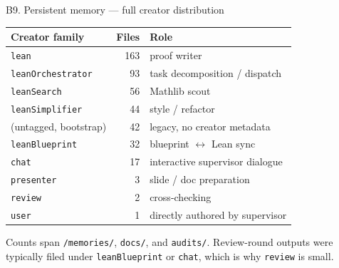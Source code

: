 \documentclass[aspectratio=169,10pt]{beamer}
\begin{document}
\begin{frame}{B9. Persistent memory --- full creator distribution}
    \begin{center}
    {\footnotesize
    \begin{tabular}{@{}l r l@{}}
        \toprule
        Creator family & Files & Role \\
        \midrule
        \texttt{lean}             & 163 & proof writer \\
        \texttt{leanOrchestrator} & 93  & task decomposition / dispatch \\
        \texttt{leanSearch}       & 56  & Mathlib scout \\
        \texttt{leanSimplifier}   & 44  & style / refactor \\
        (untagged, bootstrap)     & 42  & legacy, no creator metadata \\
        \texttt{leanBlueprint}    & 32  & blueprint $\leftrightarrow$ Lean sync \\
        \texttt{chat}             & 17  & interactive supervisor dialogue \\
        \texttt{presenter}        & 3   & slide / doc preparation \\
        \texttt{review}           & 2   & cross-checking \\
        \texttt{user}             & 1   & directly authored by supervisor \\
        \bottomrule
    \end{tabular}}
    \end{center}
    \vspace{0.4em}
    \textcolor{dimwhite}{\footnotesize Counts span \texttt{/memories/}, \texttt{docs/}, and \texttt{audits/}. Review-round outputs were typically filed under \texttt{leanBlueprint} or \texttt{chat}, which is why \texttt{review} is small.}
\end{frame}
\end{document}
